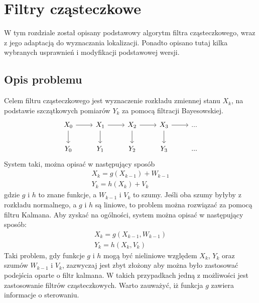 \chapter{Filtry cząsteczkowe}
W tym rozdziale został opisany podstawowy algorytm filtra cząsteczkowego, wraz z jego adaptacją do wyznaczania lokalizacji. Ponadto opisano tutaj kilka wybranych usprawnień i modyfikacji podstawowej wersji.
\section{Opis problemu}
Celem filtru cząsteczkowego jest wyznaczenie rozkładu zmiennej stanu $X_k$, na podstawie szczątkowych pomiarów $Y_k$ za pomocą filtracji Bayesowskiej. \\
\begin{equation*}
\begin{tikzcd}
	X_0 \arrow{r} \arrow{d} &X_1 \arrow{r} \arrow{d} &X_2 \arrow{r} \arrow{d} &X_3\arrow{r} \arrow{d} &...\\
	Y_0 &Y_1 &Y_2 &Y_3 &...
\end{tikzcd} 
\end{equation*}
System taki, można opisać w następujący sposób
\begin{equation*}
	\begin{aligned}
		X_k=g(X_{k-1})+W_{k-1} \\
		Y_k=h(X_k)+V_k
	\end{aligned}
\end{equation*}
gdzie $g$ i $h$ to znane funkcje, a $W_{k-1}$ i $V_k$ to szumy. Jeśli oba szumy byłyby z rozkładu normalnego, a $g$ i $h$ są liniowe, to problem można rozwiązać za pomocą filtru Kalmana. Aby zyskać na ogólności, system można opisać w następujący sposób:
\begin{equation} \label{problem_eq}
	\begin{aligned}
		X_k=g(X_{k-1}, W_{k-1}) \\
		Y_k=h(X_k, V_k)
	\end{aligned}
\end{equation}
Taki problem, gdy funkcje $g$ i $h$ mogą być nieliniowe względem $X_k$, $Y_k$ oraz szumów $W_{k-1}$ i $V_k$, zazwyczaj jest zbyt złożony aby można było zastosować podejścia oparte o filtr kalmana. W takich przypadkach jedną z możliwości jest zastosowanie filtrów cząsteczkowych. Warto zauważyć, iż funkcja $g$ zawiera informacje o sterowaniu.
